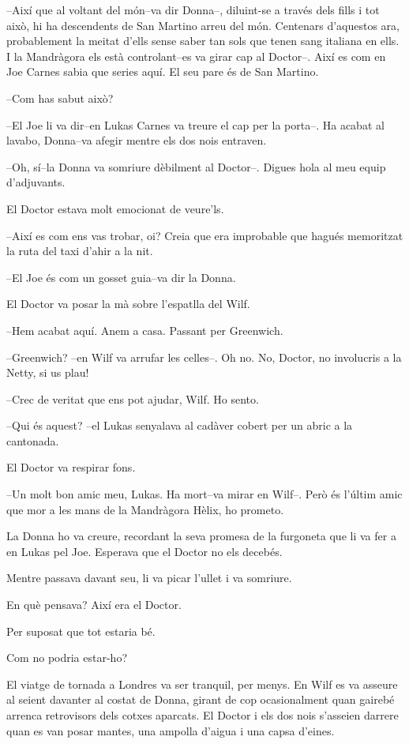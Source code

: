 --Així que al voltant del món--va dir Donna--, diluint-se a través dels
fills i tot això, hi ha descendents de San Martino arreu del món.
Centenars d'aquestos ara, probablement la meitat d'ells sense saber tan
sols que tenen sang italiana en ells. I la Mandràgora els està
controlant--es va girar cap al Doctor--. Així es com en Joe Carnes sabia
que series aquí. El seu pare és de San Martino.

--Com has sabut això?

--El Joe li va dir--en Lukas Carnes va treure el cap per la porta--. Ha
acabat al lavabo, Donna--va afegir mentre els dos nois entraven.

--Oh, sí--la Donna va somriure dèbilment al Doctor--. Digues hola al meu
equip d'adjuvants.

El Doctor estava molt emocionat de veure'ls.

--Així es com ens vas trobar, oi? Creia que era improbable que hagués
memoritzat la ruta del taxi d'ahir a la nit.

--El Joe és com un gosset guia--va dir la Donna.

El Doctor va posar la mà sobre l'espatlla del Wilf.

--Hem acabat aquí. Anem a casa. Passant per Greenwich.

--Greenwich? --en Wilf va arrufar les celles--. Oh no. No, Doctor, no
involucris a la Netty, si us plau!

--Crec de veritat que ens pot ajudar, Wilf. Ho sento.

--Qui és aquest? --el Lukas senyalava al cadàver cobert per un abric a
la cantonada.

El Doctor va respirar fons.

--Un molt bon amic meu, Lukas. Ha mort--va mirar en Wilf--. Però és
l'últim amic que mor a les mans de la Mandràgora Hèlix, ho prometo.

La Donna ho va creure, recordant la seva promesa de la furgoneta que li
va fer a en Lukas pel Joe. Esperava que el Doctor no els decebés.

Mentre passava davant seu, li va picar l'ullet i va somriure.

En què pensava? Així era el Doctor.

Per suposat que tot estaria bé.

Com no podria estar-ho?

El viatge de tornada a Londres va ser tranquil, per menys. En Wilf es va
asseure al seient davanter al costat de Donna, girant de cop
ocasionalment quan gairebé arrenca retrovisors dels cotxes aparcats. El
Doctor i els dos nois s'asseien darrere quan es van posar mantes, una
ampolla d'aigua i una capsa d'eines.

